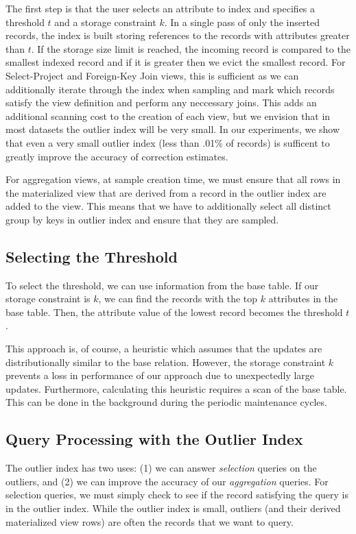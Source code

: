 The first step is that the user selects an attribute to index and specifies a threshold $t$ and a storage constraint $k$.
In a single pass of only the inserted records, the index is built storing references to the records with attributes greater than $t$.
If the storage size limit is reached, the incoming record is compared to the smallest indexed record and if it is greater then we evict the smallest record.
For Select-Project and Foreign-Key Join views, this is sufficient as we can additionally iterate through the index when sampling and mark 
which records satisfy the view definition and perform any neccessary joins. 
This adds an additional scanning cost to the creation of each view, but we envision that in most datasets the outlier index will be
very small.
In our experiments, we show that even a very small outlier index (less than .01\% of records) is sufficent to greatly improve the accuracy of
correction estimates.

For aggregation views, at sample creation time, we must ensure that all rows in the materialized view that are derived from a record in the outlier index are added to the view. 
This means that we have to additionally select all distinct group by keys in outlier index and ensure that they are sampled.

\subsection{Selecting the Threshold}
To select the threshold, we can use information from the base table.
If our storage constraint is $k$, we can find the records with the top $k$ attributes in the base table. 
Then, the attribute value of the lowest record becomes the threshold $t$.

This approach is, of course, a heuristic which assumes that the updates are distributionally similar to the 
base relation. 
However, the storage constraint $k$ prevents a loss in performance of our approach due to unexpectedly large updates.
Furthermore, calculating this heuristic requires a scan of the base table.
This can be done in the background during the periodic maintenance cycles.

\subsection{Query Processing with the Outlier Index} 
The outlier index has two uses: (1) we can answer \emph{selection} queries on the outliers, 
and (2) we can improve the accuracy of our \emph{aggregation} queries.
For selection queries, we must simply check to see if the record satisfying the query is in the outlier index.
While the outlier index is small, outliers (and their derived materialized view rows) are often the records that
we want to query.


